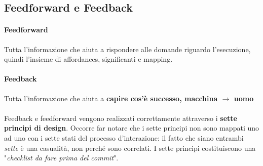 \documentclass[10pt]{article}
\begin{document}
\subsection{Feedforward e Feedback}
\paragraph{Feedforward} Tutta l'informazione che aiuta a rispondere alle domande riguardo l'esecuzione, quindi l'insieme di affordances, significanti e mapping.
\paragraph{Feedback} Tutta l'informazione che aiuta a \textbf{capire cos'è successo, macchina $\rightarrow$ uomo}\\\\
Feedback e feedforward vengono realizzati correttamente attraverso i \textbf{sette principi di design}. Occorre far notare che i sette principi non sono mappati uno ad uno con i sette stati del processo d'interazione: il fatto che siano entrambi \textit{sette} è una casualità, non perché sono correlati. I sette principi costituiscono una "\textit{checklist da fare prima del commit}".
\end{document}
